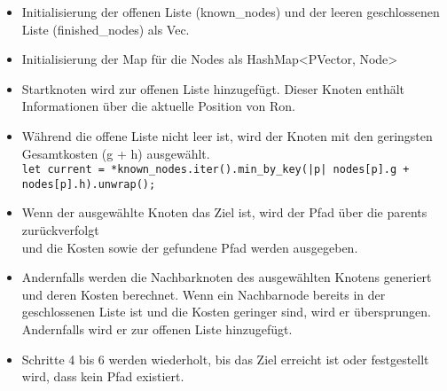 \begin{itemize}

    \item Initialisierung der offenen Liste (known\_nodes) und der leeren geschlossenen Liste (finished\_nodes) als Vec.

    \item Initialisierung der Map für die Nodes als HashMap<PVector, Node>

    \item Startknoten wird zur offenen Liste hinzugefügt. Dieser Knoten enthält Informationen über die aktuelle Position von Ron.

    \item Während die offene Liste nicht leer ist, wird der Knoten mit den geringsten Gesamtkosten (g + h) ausgewählt.\\
          \texttt{let current = *known\_nodes.iter().min\_by\_key(|p| nodes[p].g + nodes[p].h).unwrap();}

    \item Wenn der ausgewählte Knoten das Ziel ist, wird der Pfad über die parents zurückverfolgt\\ und die Kosten sowie der gefundene Pfad werden ausgegeben.

    \item Andernfalls werden die Nachbarknoten des ausgewählten Knotens generiert und deren Kosten berechnet. Wenn ein Nachbarnode bereits in der geschlossenen Liste ist und die Kosten geringer sind, wird er übersprungen. Andernfalls wird er zur offenen Liste hinzugefügt.

    \item Schritte 4 bis 6 werden wiederholt, bis das Ziel erreicht ist oder festgestellt wird, dass kein Pfad existiert.

\end{itemize}
